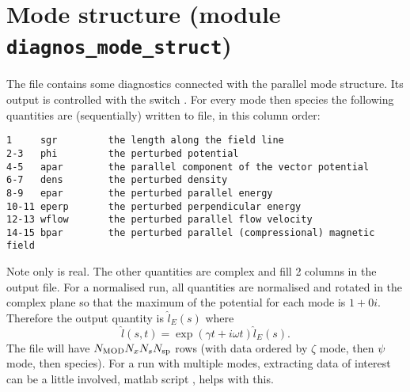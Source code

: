 \section{Mode structure (module \texttt{diagnos\_mode\_struct}) \label{sec.parallel}}
The file  contains some diagnostics connected with the parallel mode structure. Its output is controlled with the switch . 
For every mode then species the following quantities are (sequentially) written to file, in this column order:
\begin{small}
\begin{verbatim}
1     sgr         the length along the field line 
2-3   phi         the perturbed potential 
4-5   apar        the parallel component of the vector potential 
6-7   dens        the perturbed density 
8-9   epar        the perturbed parallel energy 
10-11 eperp       the perturbed perpendicular energy 
12-13 wflow       the perturbed parallel flow velocity
14-15 bpar        the perturbed parallel (compressional) magnetic field
\end{verbatim}
\end{small}
Note only  is real. The other quantities are complex and fill 2 columns in the output file. For a normalised run,
all quantities are normalised and rotated in the complex plane so that the maximum of the potential for each mode is $1+0i$.  
Therefore the output quantity is ${\hat l}_E(s)$ where
\begin{equation}
{\hat l}(s,t)=\exp(\gamma t + i \omega t){\hat l}_E(s).
\end{equation}
The file will have $N_{\rm MOD} N_x N_s N_{\rm sp}$ rows (with data ordered by $\zeta$ mode, then $\psi$ mode, then species). 
For a run with multiple modes, extracting data of interest can be a little involved, matlab script , helps with this.\\ 

